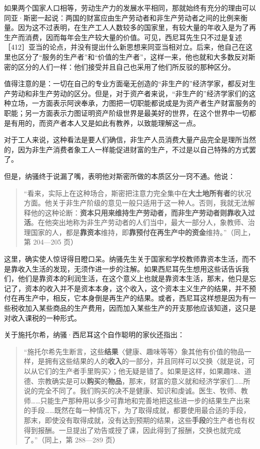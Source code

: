 如果两个国家人口相等，劳动生产力的发展水平相同，那就始终有充分的理由可以同亚·斯密一起说：两国的财富应由生产劳动者和非生产劳动者之间的比例来衡量。因为这不过表明，在生产工人人数较多的国家里，有较大量的年收入是为了再生产而消费，因而每年会生产较大量的价值。可见，西尼耳先生只不过是复述［412］亚当的论点，并没有提出什么新思想来同亚当相对立。后来，他自己在这里也区分了“服务的生产者”和“价值的生产者”，这样一来，他也就和大多数反对斯密的区分的人们一样：他们接受并且自己也采用了他们所反驳的那种区分。

值得注意的是：一切在自己的专业方面毫无创造的“非生产的”经济学家，都反对生产劳动和非生产劳动的区分。但是，对于资产者来说，“非生产的”经济学家们的这种立场，一方面表示阿谀奉承，力图把一切职能都说成是为资产者生产财富服务的职能；另一方面表示力图证明资产阶级世界是最美好的世界，在这个世界中一切都是有用的，而资产者本人又是如此有教养，以致能理解这一点。

对于工人来说，这种看法是要人们确信，非生产人员消费大量产品完全是理所当然的，因为非生产消费者象工人一样能促进财富的生产，不过是以自己特殊的方式罢了。

但是，纳骚终于说漏了嘴，表明他对斯密所做的本质区分一窍不通。他说：

\begin{quote}“看来，实际上在这种场合，斯密把注意力完全集中在\textbf{大土地所有者}的状况方面。他关于非生产阶级的意见一般只适用于这一种人。否则，我就无法解释他的这种论断：\textbf{资本只用来维持生产劳动者，而非生产劳动者则靠收入过活}。在他突出地称为非生产劳动者的人们当中，最大一部分人，象教师、治理国家的人，都是\textbf{靠资本}维持，即\textbf{靠预付在再生产中的资金}维持。”（同上，第 204—205 页）\end{quote}

这里，确实使人惊讶得目瞪口呆。纳骚先生关于国家和学校教师靠资本生活，而不是靠收入生活的发现，无须作进一步的注解。如果西尼耳先生想用这些话告诉我们，他们是靠资本的利润生活，在这个意义上也就是靠资本生活，那末，他只是忘记了，资本的收入并不是资本本身，这个收入，这个资本主义生产的结果，并不预付在再生产中，相反，它本身倒是再生产的结果。或者，西尼耳这样想是因为有一些税收加入某些商品的生产费用，因而加入某些生产的开支那他应该知道，这只是对收入课税的一种形式。

关于施托尔希，纳骚·西尼耳这个自作聪明的家伙还指出：

\begin{quote}“施托尔希先生断言，这些\textbf{结果}〈健康、趣味等等〉象其他有价值的物品一样，是拥有这些结果的人的\textbf{收入}的一部分，并且同样可以交换〈就是说，可以从它们的生产者手里购买〉；他无疑是错了。如果是这样，如果趣味、道德、宗教确实是可以\textbf{购买}的\textbf{物品}，那末，财富的意义就和经济学家们……所说的完全不同了。我们购买的决不是健康、知识和虔诚。医生、牧师、教师……只能生产那种用以多少可靠地和完善地把这些进一步的结果生产出来的手段……既然在每一种情况下，为了取得成就，都要使用最合适的手段，那末，即使没有取得成就，没有达到预期的结果，这些\textbf{手段}的生产者也有权得到报酬。一旦提出了劝告或授了课，因此得到了报酬，交换也就完成了。”（同上，第 288—289 页）\end{quote}

